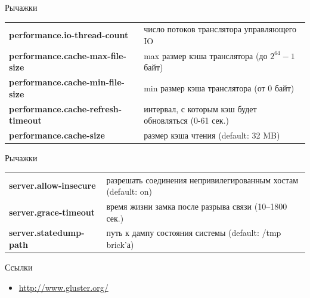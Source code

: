 \documentclass{beamer}
\begin{document}
\begin{frame}{Рычажки}
	\begin{block}{}
		\begin{tabular}{ p{6cm} p{5cm} }
			\textbf{performance.io-thread-count} & число потоков транслятора управляющего IO \\ %
			\textbf{performance.cache-max-file-size} & max размер кэша транслятора (до $2^{64} - 1$ байт)\\
			\textbf{performance.cache-min-file-size} & min размер кэша транслятора (от 0 байт)\\		
			\textbf{performance.cache-refresh-timeout} & интервал, с которым кэш будет обновляться (0-61 сек.) \\
			\textbf{performance.cache-size} & размер кэша чтения (default: 32 MB) \\
		\end{tabular}
	\end{block}
\end{frame}


\begin{frame}{Рычажки}
	\begin{block}{}
		\begin{tabular}{ p{6cm} p{5cm} }
			\textbf{server.allow-insecure} & разрешать соединения непривилегированным хостам (default: on) \\
			\textbf{server.grace-timeout} &  время жизни замка после разрыва связи (10--1800  сек.) \\
			\textbf{server.statedump-path} &  путь к дампу состояния системы (default: /tmp brick'а) \\		
		\end{tabular}
	\end{block}
\end{frame}

\begin{frame}{Ссылки}
	\begin{itemize}
		\item \url{http://www.gluster.org/}
	\end{itemize}
\end{frame}
\end{document}
